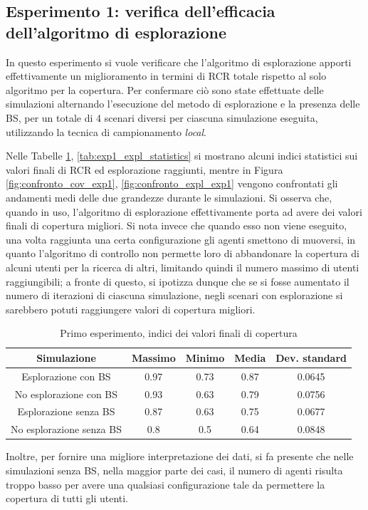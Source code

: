 \subsection{Esperimento 1: verifica dell'efficacia dell'algoritmo di esplorazione}\label{subsec:exp1}
In questo esperimento si vuole verificare che l'algoritmo di esplorazione apporti effettivamente un miglioramento in termini di RCR totale rispetto al solo algoritmo per la copertura.
Per confermare ciò sono state effettuate delle simulazioni alternando l'esecuzione del metodo di esplorazione e la presenza delle BS, per un totale di 4 scenari diversi per ciascuna simulazione eseguita, utilizzando la tecnica di campionamento \textit{local}.


Nelle Tabelle  \ref{tab:exp1_cov_statistics}, \ref{tab:exp1_expl_statistics}  si mostrano alcuni indici statistici sui valori finali di RCR ed esplorazione raggiunti, mentre in Figura  \ref{fig:confronto_cov_exp1}, \ref{fig:confronto_expl_exp1}  vengono confrontati gli andamenti medi delle due grandezze durante le simulazioni.
Si osserva che, quando in uso, l'algoritmo di esplorazione effettivamente porta ad avere dei valori finali di copertura migliori. Si nota invece che quando esso non viene eseguito, una volta raggiunta una certa configurazione gli agenti smettono di muoversi, in quanto l'algoritmo di controllo non permette loro di abbandonare la copertura di alcuni utenti per la ricerca di altri, limitando quindi il numero massimo di utenti raggiungibili; a fronte di questo, si ipotizza dunque che se si fosse aumentato il numero di iterazioni di ciascuna simulazione, negli scenari con esplorazione si sarebbero potuti raggiungere valori di copertura migliori.
\begin{table}[t]
\begin{tabular}{|c|c|c|c|c|}
\hline
Simulazione & Massimo & Minimo & Media & Dev. standard \\
\hline
Esplorazione con BS & 0.97 & 0.73 & 0.87 & 0.0645 \\
No esplorazione con BS & 0.93 & 0.63 & 0.79 & 0.0756\\
Esplorazione senza BS & 0.87 & 0.63 & 0.75 & 0.0677 \\
No esplorazione senza BS & 0.8 & 0.5 & 0.64 & 0.0848 \\
\hline
\end{tabular}
\caption{\label{tab:exp1_cov_statistics}Primo esperimento, indici dei valori finali di copertura}
\end{table}

Inoltre, per fornire una migliore interpretazione dei dati, si fa presente che nelle simulazioni senza BS, nella maggior parte dei casi, il numero di agenti risulta troppo basso per avere una qualsiasi configurazione tale da permettere la copertura di tutti gli utenti.

